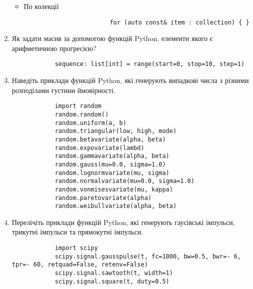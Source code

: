\begin{enumerate}
\begin{itemize}
              \item
                    По колекції
                    \begin{verbatim}
                        for (auto const& item : collection) { }
                    \end{verbatim}
          \end{itemize}

    \item
          Як задати масив за допомогою функцій Python,
          елементи якого є арифметичною прогресією?
          \begin{verbatim}
            sequence: list[int] = range(start=0, stop=10, step=1)
          \end{verbatim}

    \item
          Наведіть приклади функцій Python, які генерують випадкові числа
          з різними розподілами густини ймовірності.
          \begin{verbatim}
            import random
            random.random()
            random.uniform(a, b)
            random.triangular(low, high, mode)
            random.betavariate(alpha, beta)
            random.expovariate(lambd)
            random.gammavariate(alpha, beta)
            random.gauss(mu=0.0, sigma=1.0)
            random.lognormvariate(mu, sigma)
            random.normalvariate(mu=0.0, sigma=1.0)
            random.vonmisesvariate(mu, kappa)
            random.paretovariate(alpha)
            random.weibullvariate(alpha, beta)
          \end{verbatim}

    \item
          Перелічіть приклади функцій Python, які генерують гаусівські імпульси,
          трикутні імпульси та прямокутні імпульси.
          \begin{verbatim}
            import scipy
            scipy.signal.gausspulse(t, fc=1000, bw=0.5, bwr=- 6, tpr=- 60, retquad=False, retenv=False)
            scipy.signal.sawtooth(t, width=1)
            scipy.signal.square(t, duty=0.5)
          \end{verbatim}
\end{enumerate}
